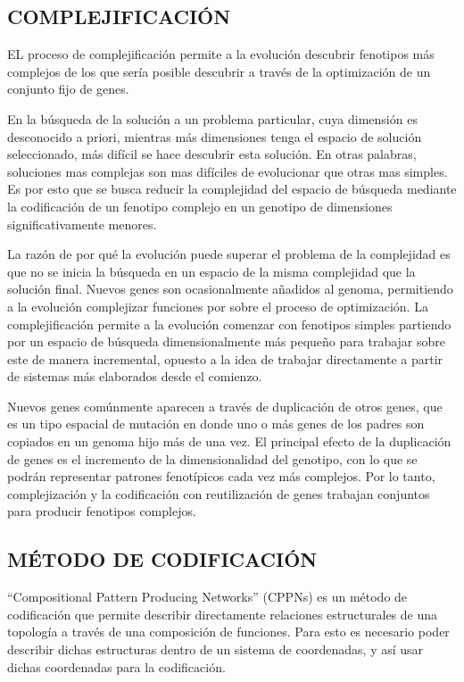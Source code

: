 \subsection{COMPLEJIFICACIÓN}

EL proceso de complejificación permite a la evolución descubrir fenotipos más complejos de los que sería posible descubrir a través de la optimización de un conjunto fijo de genes. 

En la búsqueda de la solución a un problema particular, cuya dimensión es desconocido a priori, mientras más dimensiones tenga el espacio de solución seleccionado, más difícil se hace descubrir esta solución. En otras palabras, soluciones mas complejas son mas difíciles de evolucionar que otras mas simples. Es por esto que se busca reducir la complejidad del espacio de búsqueda mediante la codificación de un fenotipo complejo en un genotipo de dimensiones significativamente menores.

La razón de por qué la evolución puede superar el problema de la complejidad es que no se inicia la búsqueda en un espacio de la misma complejidad que la solución final. Nuevos genes son ocasionalmente añadidos al genoma, permitiendo a la evolución complejizar funciones por sobre el proceso de optimización. La complejificación permite a la evolución comenzar con fenotipos simples partiendo por un espacio de búsqueda dimensionalmente más pequeño para trabajar sobre este de manera incremental, opuesto a la idea de trabajar directamente a partir de sistemas más elaborados desde el comienzo.

Nuevos genes comúnmente aparecen a través de duplicación de otros genes, que es un tipo espacial de mutación en donde uno o más genes de los padres son copiados en un genoma hijo más de una vez. El principal efecto de la duplicación de genes es el incremento de la dimensionalidad del genotipo, con lo que se podrán representar patrones fenotípicos cada vez más complejos. Por lo tanto, complejización y la codificación con reutilización de genes trabajan conjuntos para producir fenotipos complejos.

\subsection{MÉTODO DE CODIFICACIÓN}

``Compositional Pattern Producing Networks'' (CPPNs) es un método de codificación que permite describir directamente relaciones estructurales de una topología a través de una composición de funciones. Para esto es necesario poder describir dichas estructuras dentro de un sistema de coordenadas, y así usar dichas coordenadas para la codificación.

